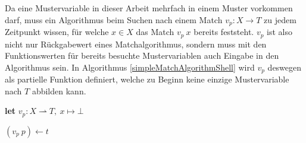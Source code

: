 Da eine Mustervariable in dieser Arbeit mehrfach in einem Muster vorkommen darf, muss ein Algorithmus beim Suchen nach einem Match $v_p \colon X \rightarrow T$ zu jedem Zeitpunkt wissen, für welche $x \in X$ das Match $v_p~x$ bereits feststeht. $v_p$ ist also nicht nur Rückgabewert eines Matchalgorithmus, sondern muss mit den Funktionswerten für bereits besuchte Mustervariablen auch Eingabe in den Algorithmus sein. In Algorithmus \ref{simpleMatchAlgorithmShell} wird $v_p$ deswegen als partielle Funktion definiert, welche zu Beginn keine einzige Mustervariable nach $T$ abbilden kann. \\

\begin{algorithm}
\DontPrintSemicolon
\caption{$\mathrm{simpleMatchAlgorithmShell} \colon M \times T \rightarrow (\mathit{Bool}, X \rightharpoonup T)$}\label{simpleMatchAlgorithmShell}

\textbf{let} $v_p \colon X \rightharpoonup T,~ x \mapsto \bot$\;
\end{algorithm}

\begin{algorithm}
\DontPrintSemicolon
\caption{$\mathrm{simpleMatchAlgorithm} \colon M \times T \times (X \rightharpoonup T) \rightarrow (\mathit{Bool}, X \rightharpoonup T)$}\label{simpleMatchAlgorithm}

 {
	$(v_p~p) \leftarrow t$\;
}
 {
}
\end{algorithm}


